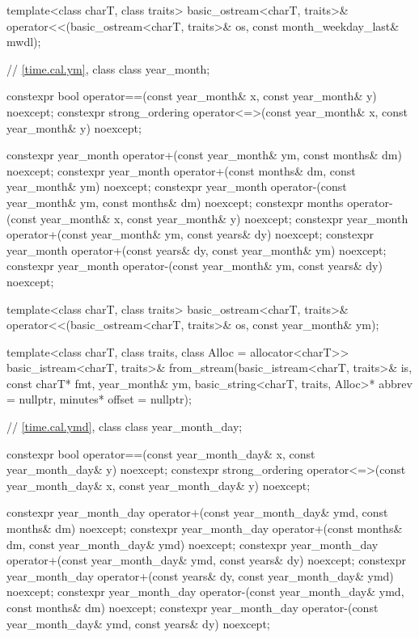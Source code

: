 \begin{codeblock}
{{    template<class charT, class traits>
      basic_ostream<charT, traits>&
        operator<<(basic_ostream<charT, traits>& os, const month_weekday_last& mwdl);

    // \ref{time.cal.ym}, class 
    class year_month;

    constexpr bool operator==(const year_month& x, const year_month& y) noexcept;
    constexpr strong_ordering operator<=>(const year_month& x, const year_month& y) noexcept;

    constexpr year_month operator+(const year_month& ym, const months& dm) noexcept;
    constexpr year_month operator+(const months& dm, const year_month& ym) noexcept;
    constexpr year_month operator-(const year_month& ym, const months& dm) noexcept;
    constexpr months operator-(const year_month& x, const year_month& y) noexcept;
    constexpr year_month operator+(const year_month& ym, const years& dy) noexcept;
    constexpr year_month operator+(const years& dy, const year_month& ym) noexcept;
    constexpr year_month operator-(const year_month& ym, const years& dy) noexcept;

    template<class charT, class traits>
      basic_ostream<charT, traits>&
        operator<<(basic_ostream<charT, traits>& os, const year_month& ym);

    template<class charT, class traits, class Alloc = allocator<charT>>
      basic_istream<charT, traits>&
        from_stream(basic_istream<charT, traits>& is, const charT* fmt,
                    year_month& ym, basic_string<charT, traits, Alloc>* abbrev = nullptr,
                    minutes* offset = nullptr);

    // \ref{time.cal.ymd}, class 
    class year_month_day;

    constexpr bool operator==(const year_month_day& x, const year_month_day& y) noexcept;
    constexpr strong_ordering operator<=>(const year_month_day& x,
                                          const year_month_day& y) noexcept;

    constexpr year_month_day operator+(const year_month_day& ymd, const months& dm) noexcept;
    constexpr year_month_day operator+(const months& dm, const year_month_day& ymd) noexcept;
    constexpr year_month_day operator+(const year_month_day& ymd, const years& dy) noexcept;
    constexpr year_month_day operator+(const years& dy, const year_month_day& ymd) noexcept;
    constexpr year_month_day operator-(const year_month_day& ymd, const months& dm) noexcept;
    constexpr year_month_day operator-(const year_month_day& ymd, const years& dy) noexcept;

}}
\end{codeblock}
